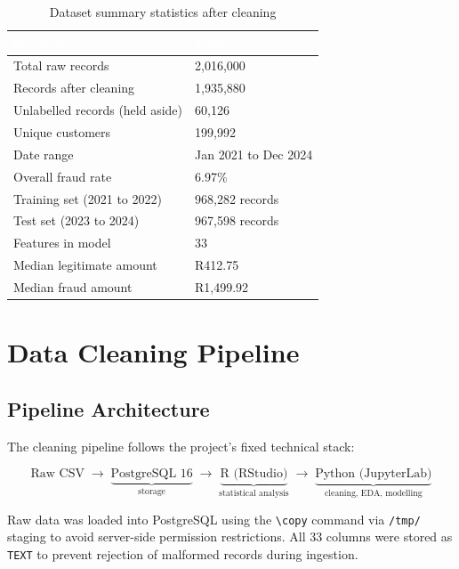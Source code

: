 \documentclass[12pt, a4paper]{article}
\begin{document}
\begin{table}[H]
\centering
\caption{Dataset summary statistics after cleaning}
\label{tab:summary}
\begin{tabular}{L{5cm}R{4cm}}
\toprule
{}
\textcolor{white}{\textbf{Statistic}} & \textcolor{white}{\textbf{Value}} \\
\midrule
Total raw records & 2,016,000 \\
Records after cleaning & 1,935,880 \\
Unlabelled records (held aside) & 60,126 \\
Unique customers & 199,992 \\
Date range & Jan 2021 to Dec 2024 \\
Overall fraud rate & 6.97\% \\
Training set (2021 to 2022) & 968,282 records \\
Test set (2023 to 2024) & 967,598 records \\
Features in model & 33 \\
Median legitimate amount & R412.75 \\
Median fraud amount & R1,499.92 \\
\bottomrule
\end{tabular}
\end{table}

\section{Data Cleaning Pipeline}

\subsection{Pipeline Architecture}

The cleaning pipeline follows the project's fixed technical stack:

\[
\text{Raw CSV} \;\rightarrow\; \underbrace{\text{PostgreSQL 16}}_{\text{storage}} \;\rightarrow\; \underbrace{\text{R (RStudio)}}_{\text{statistical analysis}} \;\rightarrow\; \underbrace{\text{Python (JupyterLab)}}_{\text{cleaning, EDA, modelling}}
\]

Raw data was loaded into PostgreSQL using the \texttt{\textbackslash copy} command via \texttt{/tmp/} staging to avoid server-side permission restrictions. All 33 columns were stored as \texttt{TEXT} to prevent rejection of malformed records during ingestion.
\end{document}
